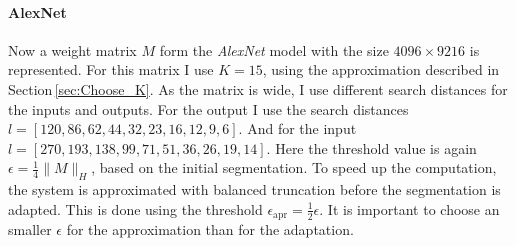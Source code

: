 \documentclass[doctype=mastersthesis,BCOR=15mm,biblatex]{ldvbook}%
\begin{document}
\paragraph{AlexNet}
Now a weight matrix $M$ form the \emph{AlexNet} model with the size ${4096 \times 9216}$ is represented.
For this matrix I use $K=15$, using the approximation described in Section\,\ref{sec:Choose_K}.
As the matrix is wide, I use different search distances for the inputs and outputs.
For the output I use the search distances $l =  [120,  86,  62,  44,  32,  23,  16,  12,   9,   6]$.
And for the input $l =  [270, 193, 138,  99,  71,  51,  36,  26,  19,  14]$.
Here the threshold value is again $\epsilon = \frac{1}{4} \|M\|_H$, based on the initial segmentation.
To speed up the computation, the system is approximated with balanced truncation before the segmentation is adapted.
This is done using the threshold $\epsilon_{\text{apr}}=\frac{1}{2} \epsilon$.
It is important to choose an smaller $\epsilon$ for the approximation than for the adaptation.
\end{document}
